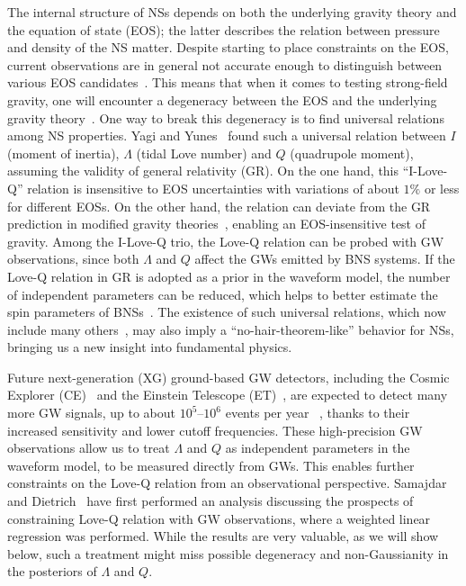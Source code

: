 \documentclass[a4paper,11pt]{article}
\begin{document}
The internal structure of NSs depends on both the underlying gravity theory and
the equation of state (EOS); the latter describes the relation between pressure
and density of the NS matter. Despite starting to place constraints on the EOS,
current observations are in general not accurate enough to distinguish between
various EOS candidates~\cite{Lattimer:2006xb, Steiner:2010fz, Ozel:2010fw,
Hebeler:2013nza, Ozel_2013}.  This means that when it comes to testing
strong-field gravity, one will encounter a degeneracy between the EOS and the
underlying gravity theory~\cite{Yagi:2013bca, Yagi:2013awa, Shao:2017gwu,
Shao:2019gjj, Silva:2020acr, Shao:2022koz}.  One way to break this degeneracy is
to find universal relations among NS properties.  Yagi and
Yunes~\cite{Yagi:2013bca, Yagi:2013awa} found such a universal relation between 
$I$ (moment of inertia), $\Lambda$ (tidal Love number) and $Q$ (quadrupole
moment), assuming the validity of general relativity (GR).  On the one hand,
this ``I-Love-Q'' relation is insensitive to EOS uncertainties with variations
of about $1\%$ or less for different EOSs.  On the other hand, the relation can
deviate from the GR prediction in modified gravity theories~\cite{Yagi_2017,
Gupta:2017vsl, Yunes:2025xwp}, enabling an EOS-insensitive test of gravity.
Among the I-Love-Q trio, the Love-Q relation can be probed with GW observations,
since both $\Lambda$ and $Q$ affect the GWs emitted by BNS systems.  If the
Love-Q relation in GR is adopted as a prior in the waveform model, the number of
independent parameters can be reduced, which helps to better estimate the spin
parameters of BNSs~\cite{Yagi:2013bca, LIGOScientific:2018cki,
LIGOScientific:2018hze, LIGOScientific:2020aai}. The existence of such universal
relations, which now include many others~\cite{Lau:2009bu, Yagi:2013sva,
Maselli:2013mva, Pani:2015nua, Yagi:2016qmr, Gao:2023mwu, Hu:2025gab}, may also
imply a ``no-hair-theorem-like'' behavior for NSs, bringing us a new insight
into fundamental physics. 

Future next-generation (XG) ground-based GW detectors, including the Cosmic
Explorer (CE)~\cite{Reitze:2019iox, Reitze:2019dyk} and the Einstein Telescope
(ET)~\cite{Punturo:2010zz, Hild:2010id, Sathyaprakash:2012jk, ET:2025xjr}, are
expected to detect many more GW signals, up to about $10^5$--$10^6$ events per
year ~\cite{LIGOScientific:2017zlf, Sathyaprakash:2019yqt, Kalogera:2021bya,
Samajdar:2021egv}, thanks to their increased sensitivity and lower cutoff
frequencies. These high-precision GW observations allow us to treat $\Lambda$
and $Q$ as independent parameters in the waveform model, to be measured directly
from GWs. This enables further constraints on the Love-Q relation from an
observational perspective.  Samajdar and Dietrich~\cite{Samajdar:2020xrd} have
first performed an analysis discussing the prospects of constraining Love-Q 
relation with GW observations, where a weighted linear regression was performed.
While the results are very valuable, as we will show below, such a treatment
might miss possible degeneracy and non-Gaussianity in the posteriors of
$\Lambda$ and $Q$. 
\end{document}
